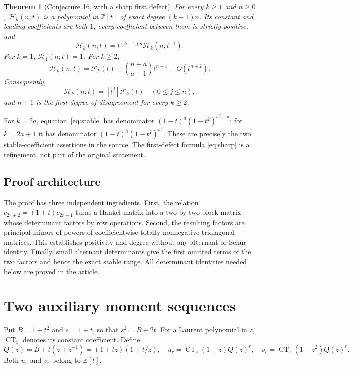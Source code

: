 \documentclass[11pt]{article}
\newtheorem{theorem}{Theorem}[section]
\theoremstyle{definition}
\theoremstyle{remark}
\newcommand{\Z}{\mathbb Z}
\newcommand{\CT}{\operatorname{CT}}
\newcommand{\Ht}{\mathcal H}
\newcommand{\F}{\mathcal F}
\numberwithin{equation}{section}
\begin{document}
\begin{theorem}[Conjecture 16, with a sharp first defect]
\label{thm:main}
For every $k\ge1$ and $n\ge0$, $\Ht_k(n;t)$ is a polynomial in $\Z[t]$ of
exact degree $(k-1)n$. Its constant and leading coefficients are both $1$,
every coefficient between them is strictly positive, and
\begin{equation}
 \Ht_k(n;t)=t^{(k-1)n}\Ht_k(n;t^{-1}).
 \label{eq:pal}
\end{equation}
For $k=1$, $\Ht_1(n;t)=1$. For $k\ge2$,
\begin{equation}
 \Ht_k(n;t)=\F_k(t)
 -\binom{n+a}{a-1}t^{n+1}+O(t^{n+2}).
 \label{eq:sharp}
\end{equation}
Consequently,
\begin{equation}
 [t^j]\Ht_k(n;t)=[t^j]\F_k(t)\quad(0\le j\le n),
 \label{eq:stable}
\end{equation}
and $n+1$ is the first degree of disagreement for every $k\ge2$.
\end{theorem}

For $k=2a$, equation~\eqref{eq:stable} has denominator
$(1-t)^a(1-t^2)^{a^2-a}$; for $k=2a+1$ it has denominator
$(1-t)^a(1-t^2)^{a^2}$. These are precisely the two stable-coefficient
assertions in the source. The first-defect formula \eqref{eq:sharp} is a
refinement, not part of the original statement.

\subsection{Proof architecture}
The proof has three independent ingredients. First, the relation
$c_{2r+2}=(1+t)c_{2r+1}$ turns a Hankel matrix into a two-by-two block matrix
whose determinant factors by row operations. Second, the resulting factors
are principal minors of powers of coefficientwise totally nonnegative
tridiagonal matrices. This establishes positivity and degree without any
alternant or Schur identity. Finally, small alternant determinants give the
first omitted terms of the two factors and hence the exact stable range.
All determinant identities needed below are proved in the article.

\section{Two auxiliary moment sequences}
\label{sec:moments}

Put $B=1+t^2$ and $s=1+t$, so that $s^2=B+2t$.
For a Laurent polynomial in $z$, $\CT_z$ denotes its constant coefficient.
Define
\begin{equation}
 Q(z)=B+t(z+z^{-1})=(1+tz)(1+t/z),
 \quad
 u_r=\CT_z(1+z)Q(z)^r,
 \quad
 v_r=\CT_z(1-z^2)Q(z)^r.
 \label{eq:uv-ct}
\end{equation}
Both $u_r$ and $v_r$ belong to $\Z[t]$.
\end{document}
